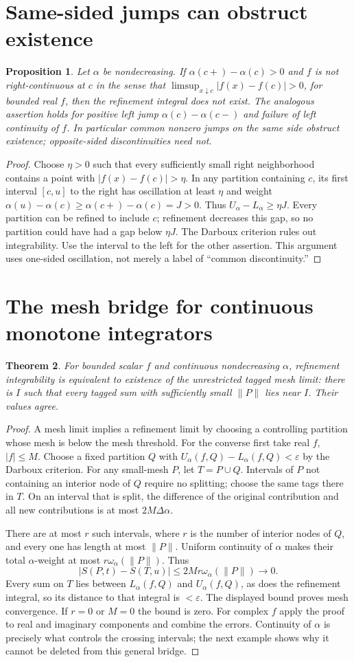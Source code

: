 \documentclass[11pt,oneside,a4paper]{book}
\newtheorem{theorem}{Theorem}[chapter]
\newtheorem{proposition}[theorem]{Proposition}
\theoremstyle{definition}
\theoremstyle{remark}
\newcommand{\eps}{\varepsilon}
\newcommand{\abs}[1]{\lvert#1\rvert}
\newcommand{\norm}[1]{\lVert#1\rVert}
\newcommand{\KEntry}[2]{\Needspace{7\baselineskip}\section{#2}\label{#1}{\small\sffamily\color{black!60}\detokenize{#1}}\par}
\begin{document}
\KEntry{K03.15.rs_common_jumps}{Same-sided jumps can obstruct existence}
\begin{proposition}
Let $\alpha$ be nondecreasing. If $\alpha(c+)-\alpha(c)>0$ and $f$ is not right-continuous at $c$ in the sense that $\limsup_{x\downarrow c}\abs{f(x)-f(c)}>0$, for bounded real $f$, then the refinement integral does not exist. The analogous assertion holds for positive left jump $\alpha(c)-\alpha(c-)$ and failure of left continuity of $f$. In particular common nonzero jumps on the same side obstruct existence; opposite-sided discontinuities need not.
\end{proposition}
\begin{proof}
Choose $\eta>0$ such that every sufficiently small right neighborhood contains a point with $\abs{f(x)-f(c)}>\eta$. In any partition containing $c$, its first interval $[c,u]$ to the right has oscillation at least $\eta$ and weight $\alpha(u)-\alpha(c)\geq\alpha(c+)-\alpha(c)=J>0$. Thus $U_\alpha-L_\alpha\geq\eta J$. Every partition can be refined to include $c$; refinement decreases this gap, so no partition could have had a gap below $\eta J$. The Darboux criterion rules out integrability. Use the interval to the left for the other assertion. This argument uses one-sided oscillation, not merely a label of ``common discontinuity.''
\end{proof}

\KEntry{K03.15.rs_mesh_bridge}{The mesh bridge for continuous monotone integrators}
\begin{theorem}
For bounded scalar $f$ and continuous nondecreasing $\alpha$, refinement integrability is equivalent to existence of the unrestricted tagged mesh limit: there is $I$ such that every tagged sum with sufficiently small $\norm P$ lies near $I$. Their values agree.
\end{theorem}
\begin{proof}
A mesh limit implies a refinement limit by choosing a controlling partition whose mesh is below the mesh threshold. For the converse first take real $f$, $\abs f\leq M$. Choose a fixed partition $Q$ with $U_\alpha(f,Q)-L_\alpha(f,Q)<\eps$ by the Darboux criterion. For any small-mesh $P$, let $T=P\cup Q$. Intervals of $P$ not containing an interior node of $Q$ require no splitting; choose the same tags there in $T$. On an interval that is split, the difference of the original contribution and all new contributions is at most $2M\Delta\alpha$.

There are at most $r$ such intervals, where $r$ is the number of interior nodes of $Q$, and every one has length at most $\norm P$. Uniform continuity of $\alpha$ makes their total $\alpha$-weight at most $r\omega_\alpha(\norm P)$. Thus
\[\abs{S(P,t)-S(T,u)}\leq2Mr\omega_\alpha(\norm P)\longrightarrow0.\]
Every sum on $T$ lies between $L_\alpha(f,Q)$ and $U_\alpha(f,Q)$, as does the refinement integral, so its distance to that integral is $<\eps$. The displayed bound proves mesh convergence. If $r=0$ or $M=0$ the bound is zero. For complex $f$ apply the proof to real and imaginary components and combine the errors. Continuity of $\alpha$ is precisely what controls the crossing intervals; the next example shows why it cannot be deleted from this general bridge.
\end{proof}
\end{document}
